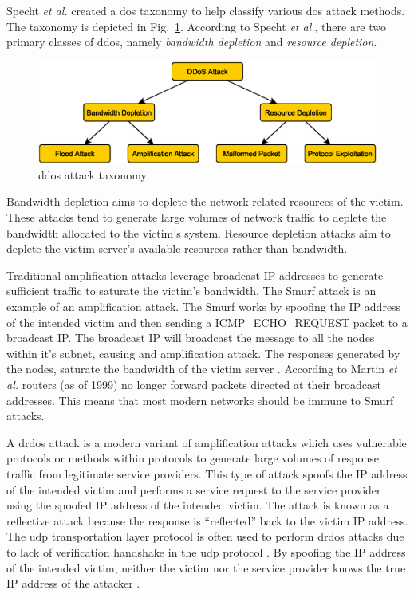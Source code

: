 Specht  \textit{et al.}  \cite{specht2004distributed} created a \gls{dos} taxonomy to help classify various \gls{dos} attack
methods.  The taxonomy is depicted in Fig.~\ref{fig:Chap2_DDoS_Tax}.
According to Specht  \textit{et al.}\cite{specht2004distributed}, there are two primary classes of \gls{ddos}, namely \textit{bandwidth depletion} and \textit{resource depletion}.

\begin{figure}[h]
    \centering
    \includegraphics[width=\columnwidth]{section_2/DDoS_Taxonomy.eps}
    \caption{\gls{ddos} attack taxonomy  \cite{specht2004distributed}}
    \label{fig:Chap2_DDoS_Tax}
\end{figure}

Bandwidth depletion aims to deplete the network related resources of the victim. These attacks tend to generate large volumes of network traffic to deplete the bandwidth allocated to the victim's system. Resource depletion attacks aim to deplete the victim server's available resources rather than bandwidth.

Traditional amplification attacks leverage broadcast IP addresses to generate sufficient traffic to saturate the victim's bandwidth. The Smurf attack is an example of an amplification attack. The Smurf works by spoofing the IP address of the intended victim and then sending a ICMP\_ECHO\_REQUEST packet to a broadcast IP. The broadcast IP will broadcast the message to all the nodes within it's subnet, causing and amplification attack. The responses generated by the nodes, saturate the bandwidth of the victim server  \cite{kumar2007smurf}. According to Martin \textit{et al.}\cite{martin2002router} routers (as of 1999) no longer forward packets directed at their broadcast addresses. This means that most modern networks should be immune to Smurf attacks.

A \gls{drdos} attack is a modern variant of amplification attacks which uses vulnerable protocols or methods within protocols to generate large volumes of response traffic from legitimate service providers. This type of attack spoofs the IP address of the intended victim and performs a service request to the service provider using the spoofed IP address of the intended victim. The attack is known as a reflective attack because the response is ``reflected'' back to the victim IP address.  The \gls{udp} transportation layer protocol is often used to perform \gls{drdos} attacks due to lack of verification handshake in the \gls{udp} protocol  \cite{USCert2018}. By spoofing the IP address of the intended victim, neither the victim nor the service provider knows the true IP address of the attacker  \cite{USCert2018}.

